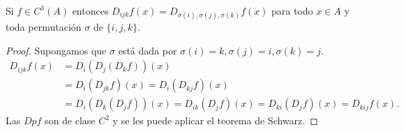 \begin{corolario}
    Si $f \in C^3(A)$ entonces $D_{ijk}f(x) = D_{\sigma(i), \sigma(j), \sigma(k)}f(x)$ para todo $x \in A$ y toda permutación $\sigma$ de $\{i, j, k\}$.
\end{corolario}
\begin{proof}
    Supongamos que $\sigma$ está dada por $\sigma(i) = k, \sigma(j) = i, \sigma(k) = j$. 
    \begin{align*}
    D_{ijk}f(x) 
        &= D_i(D_j(D_k f))(x) \\
        &= D_i(D_{jk} f)(x) = D_i(D_{kj} f)(x) \\
        &= D_i(D_k(D_j f))(x) = D_{ik}(D_j f)(x) = D_{ki}(D_j f)(x) = D_{kij} f(x).
\end{align*}
    Las $Dpf$ son de clase $C^2$ y se les puede aplicar el teorema de Schwarz.
\end{proof}

